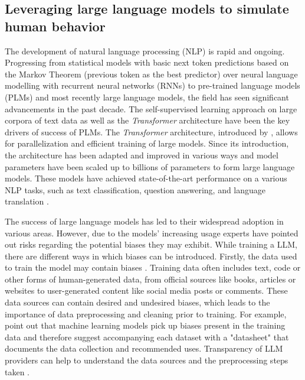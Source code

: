 \subsection{Leveraging large language models to simulate human behavior}
\par The development of natural language processing (NLP) is rapid and ongoing. Progressing from statistical models with basic next token predictions based on the Markov Theorem (previous token as the best predictor) over neural language modelling with recurrent neural networks (RNNs) to pre-trained language models (PLMs) and most recently large language models, the field has seen significant advancements in the past decade. The self-supervised learning approach on large corpora of text data as well as the \textit{Transformer} architecture have been the key drivers of success of PLMs. The \textit{Transformer} architecture, introduced by \textcite{vaswani2017attention}, allows for parallelization and efficient training of large models. Since its introduction, the architecture has been adapted and improved in various ways and model parameters have been scaled up to billions of parameters to form large language models. These models have achieved state-of-the-art performance on a various NLP tasks, such as text classification, question answering, and language translation \parencite{naveed2023comprehensive, zhao2023survey}.

\par The success of large language models has led to their widespread adoption in various areas. However, due to the models' increasing usage experts have pointed out risks regarding the potential biases they may exhibit. While training a LLM, there are different ways in which biases can be introduced. Firstly, the data used to train the model may contain biases \parencite{bender2021dangers, naveed2023comprehensive, zhao2023survey}. Training data often includes text, code or other forms of human-generated data, from official sources like books, articles or websites to user-generated content like social media posts or comments. These data sources can contain desired and undesired biases, which leads to the importance of data preprocessing and cleaning prior to training. For example, \textcite{gebru2021datasheets} point out that machine learning models pick up biases present in the training data and therefore suggest accompanying each dataset with a "datasheet" that documents the data collection and recommended uses. Transparency of LLM providers can help to understand the data sources and the preprocessing steps taken \parencite{naveed2023comprehensive, zhao2023survey}.

